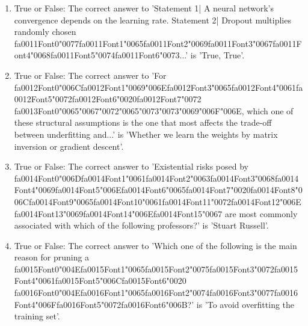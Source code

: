 \documentclass[12pt]{article}
\begin{document}
\begin{enumerate}[label=\arabic*.]
\item True or False: The correct answer to 'Statement 1| A neural network's convergence depends on the learning rate. Statement 2| Dropout multiplies randomly chosen {\csname fa0011Font0\endcsname\char"0077}{\csname fa0011Font1\endcsname\char"0065}{\csname fa0011Font2\endcsname\char"0069}{\csname fa0011Font3\endcsname\char"0067}{\csname fa0011Font4\endcsname\char"0068}{\csname fa0011Font5\endcsname\char"0074}{\csname fa0011Font6\endcsname\char"0073}...' is 'True, True'.
\item True or False: The correct answer to 'For {\csname fa0012Font0\endcsname\char"006C}{\csname fa0012Font1\endcsname\char"0069}{\char"006E}{\csname fa0012Font3\endcsname\char"0065}{\csname fa0012Font4\endcsname\char"0061}{\csname fa0012Font5\endcsname\char"0072}{\csname fa0012Font6\endcsname\char"0020}{\csname fa0012Font7\endcsname\char"0072} {\csname fa0013Font0\endcsname\char"0065}{\char"0067}{\char"0072}{\char"0065}{\char"0073}{\char"0073}{\char"0069}{\char"006F}{\char"006E}, which one of these structural assumptions is the one that most affects the trade-off between underfitting and...' is 'Whether we learn the weights by matrix inversion or gradient descent'.
\item True or False: The correct answer to 'Existential risks posed by {\csname fa0014Font0\endcsname\char"006D}{\csname fa0014Font1\endcsname\char"0061}{\csname fa0014Font2\endcsname\char"0063}{\csname fa0014Font3\endcsname\char"0068}{\csname fa0014Font4\endcsname\char"0069}{\csname fa0014Font5\endcsname\char"006E}{\csname fa0014Font6\endcsname\char"0065}{\csname fa0014Font7\endcsname\char"0020}{\csname fa0014Font8\endcsname\char"006C}{\csname fa0014Font9\endcsname\char"0065}{\csname fa0014Font10\endcsname\char"0061}{\csname fa0014Font11\endcsname\char"0072}{\csname fa0014Font12\endcsname\char"006E}{\csname fa0014Font13\endcsname\char"0069}{\csname fa0014Font14\endcsname\char"006E}{\csname fa0014Font15\endcsname\char"0067} are most commonly associated with which of the following professors?' is 'Stuart Russell'.
\item True or False: The correct answer to 'Which one of the following is the main reason for pruning a {\csname fa0015Font0\endcsname\char"004E}{\csname fa0015Font1\endcsname\char"0065}{\csname fa0015Font2\endcsname\char"0075}{\csname fa0015Font3\endcsname\char"0072}{\csname fa0015Font4\endcsname\char"0061}{\csname fa0015Font5\endcsname\char"006C}{\csname fa0015Font6\endcsname\char"0020} {\csname fa0016Font0\endcsname\char"004E}{\csname fa0016Font1\endcsname\char"0065}{\csname fa0016Font2\endcsname\char"0074}{\csname fa0016Font3\endcsname\char"0077}{\csname fa0016Font4\endcsname\char"006F}{\csname fa0016Font5\endcsname\char"0072}{\csname fa0016Font6\endcsname\char"006B}?' is 'To avoid overfitting the training set'.

\end{enumerate}
\end{document}
